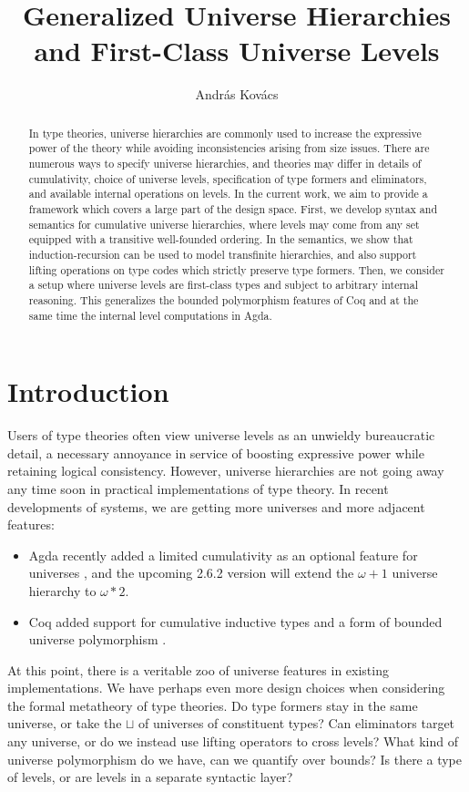 \documentclass[a4paper,UKenglish,cleveref, autoref, thm-restate]{lipics-v2021}
\title{Generalized Universe Hierarchies and First-Class Universe Levels}
\author{András Kovács}{Eötvös Loránd University, Hungary}{kovacsandras@inf.elte.hu}{https://orcid.org/0000-0002-6375-9781}{}
\theoremstyle{remark}
\theoremstyle{definition}
\begin{document}
\maketitle

\begin{abstract}
In type theories, universe hierarchies are commonly used to increase the
expressive power of the theory while avoiding inconsistencies arising from size
issues. There are numerous ways to specify universe hierarchies, and theories
may differ in details of cumulativity, choice of universe levels, specification
of type formers and eliminators, and available internal operations on levels. In
the current work, we aim to provide a framework which covers a large part of the
design space. First, we develop syntax and semantics for cumulative universe
hierarchies, where levels may come from any set equipped with a transitive
well-founded ordering. In the semantics, we show that induction-recursion can be
used to model transfinite hierarchies, and also support lifting operations on
type codes which strictly preserve type formers. Then, we consider a setup where
universe levels are first-class types and subject to arbitrary internal
reasoning. This generalizes the bounded polymorphism features of Coq and at the
same time the internal level computations in Agda.
\end{abstract}

\section{Introduction}
\label{sec:introduction}

Users of type theories often view universe levels as an unwieldy bureaucratic
detail, a necessary annoyance in service of boosting expressive power while
retaining logical consistency. However, universe hierarchies are not going away
any time soon in practical implementations of type theory. In recent
developments of systems, we are getting more universes and more adjacent
features:
\begin{itemize}
\item Agda recently added a limited cumulativity as an optional feature
  for universes \cite{agdadocs}, and the upcoming 2.6.2 version will extend the $\omega+1$
  universe hierarchy to $\omega*2$.
\item Coq added support for cumulative inductive types \cite{timany18cumulative}
  and a form of bounded universe polymorphism \cite{ziliani15unification}.
\end{itemize}
\noindent At this point, there is a veritable zoo of universe features in existing
implementations. We have perhaps even more design choices when considering the
formal metatheory of type theories. Do type formers stay in the same
universe, or take the $\sqcup$ of universes of constituent types? Can
eliminators target any universe, or do we instead use lifting operators to cross
levels? What kind of universe polymorphism do we have, can we quantify over
bounds? Is there a type of levels, or are levels in a separate syntactic layer?
\end{document}
